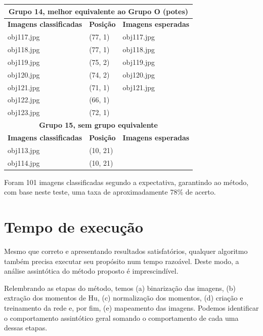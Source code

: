 \begin{center}
\begin{longtable}{|l|l|l|}
    \multicolumn{3}{|c|}{\textbf{Grupo 14, melhor equivalente ao Grupo O
      (potes)}} \\
    \hline\hline
    \textbf{Imagens classificadas} & \textbf{Posição} & \textbf{Imagens esperadas} \\
    \hline\hline

    obj117.jpg & (77, 1) & obj117.jpg \\
    \hline
    obj118.jpg & (77, 1) & obj118.jpg \\
    \hline
    obj119.jpg & (75, 2) & obj119.jpg \\
    \hline
    obj120.jpg & (74, 2) & obj120.jpg \\
    \hline
    obj121.jpg & (71, 1) & obj121.jpg \\
    \hline
    obj122.jpg & (66, 1) & \\
    \hline
    obj123.jpg & (72, 1) & \\
    \hline\hline

    \multicolumn{3}{|c|}{\textbf{Grupo 15, sem grupo equivalente}} \\
    \hline\hline
    \textbf{Imagens classificadas} & \textbf{Posição} & \textbf{Imagens esperadas} \\
    \hline\hline

    obj113.jpg & (10, 21) & \\
    \hline
    obj114.jpg & (10, 21) & \\
    \hline

  \end{longtable}
\end{center}

Foram 101 imagens classificadas segundo a expectativa, garantindo ao método, com base
neste teste, uma taxa de aproximadamente 78\% de acerto.

\section{Tempo de execução}

Mesmo que correto e apresentando resultados satisfatórios, qualquer algoritmo
também precisa executar seu propósito num tempo razoável. Deste modo, a análise
assintótica do método proposto é imprescindível.

Relembrando as etapas do método, temos (a) binarização das imagens, (b)
extração dos momentos de Hu, (c) normalização dos momentos, (d) criação e
treinamento da rede e, por fim, (e) mapeamento das imagens. Podemos identificar o
comportamento assintótico geral somando o comportamento de cada uma dessas
etapas.

